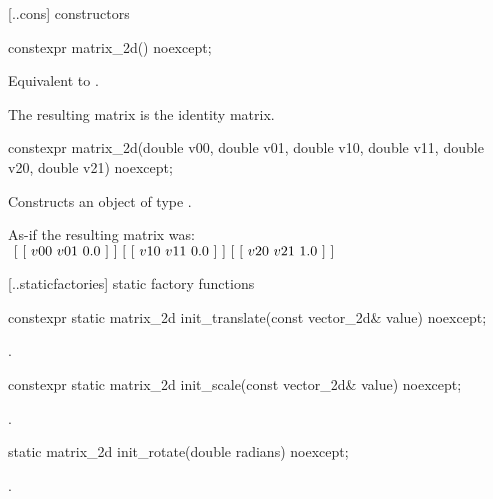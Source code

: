  [\iotwod.\matrixtwod.cons] { constructors}

%
\begin{itemdecl}
constexpr matrix_2d() noexcept;
\end{itemdecl}
\begin{itemdescr}
\pnum
\effects
Equivalent to .

\pnum
\begin{note}
The resulting matrix is the identity matrix.
\end{note}
\end{itemdescr}

%
\begin{itemdecl}
constexpr matrix_2d(double v00, double v01, double v10, double v11,
  double v20, double v21) noexcept;
\end{itemdecl}
\begin{itemdescr}
\pnum
\effects
Constructs an object of type .

\pnum
As-if the resulting matrix was: \\
$
~[~[~v00~v01~0.0~]~] \\
~[~[~v10~v11~0.0~]~] \\
~[~[~v20~v21~1.0~]~]$

\end{itemdescr}

 [\iotwod.\matrixtwod.staticfactories] { static factory 
functions}

%
\begin{itemdecl}
constexpr static matrix_2d init_translate(const vector_2d& value) noexcept;
\end{itemdecl}
\begin{itemdescr}
\pnum
\returns
{}.
\end{itemdescr}

%
\begin{itemdecl}
constexpr static matrix_2d init_scale(const vector_2d& value) noexcept;
\end{itemdecl}
\begin{itemdescr}
\pnum
\returns
{}.
\end{itemdescr}

%
\begin{itemdecl}
static matrix_2d init_rotate(double radians) noexcept;
\end{itemdecl}
\begin{itemdescr}
\pnum
\returns
{}.
\end{itemdescr}

